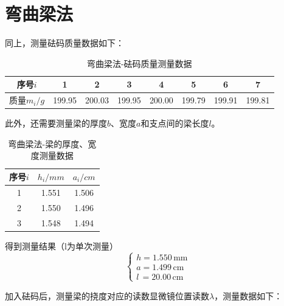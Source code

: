 \documentclass[12pt]{article}
\begin{document}
\section{弯曲梁法}
\quad 同上，测量砝码质量数据如下：\\
\begin{table}[H]
    \centering
    \begin{tabular}{cccccccc}
    序号$i$   & 1      & 2      & 3      & 4      & 5      & 6      & 7      \\ \hline
    质量$m_i/g$ & 199.95 & 200.03 & 199.95 & 200.00 & 199.79 & 199.91 & 199.81
    \end{tabular}
    \caption{弯曲梁法-砝码质量测量数据}
\end{table}
\par
此外，还需要测量梁的厚度$b$、宽度$a$和支点间的梁长度$l$。
\begin{table}[H]
    \centering
    \begin{tabular}{ccc}
    \hline
    序号$i$ & $h_i/mm$ & $a_i/cm$ \\ \hline
    1   & 1.551  & 1.506  \\
    2   & 1.550  & 1.496  \\
    3   & 1.548  & 1.494  \\ \hline
    \end{tabular}
    \caption{弯曲梁法-梁的厚度、宽度测量数据}
\end{table}
得到测量结果（l为单次测量）\\
\[
    \begin{cases}
        h = 1.550\,\text{mm} \\
        a = 1.499\,\text{cm} \\
        l\, = 20.00\,\text{cm}
    \end{cases}
\]
\par 
加入砝码后，测量梁的挠度对应的读数显微镜位置读数$\lambda$，测量数据如下：
\end{document}
